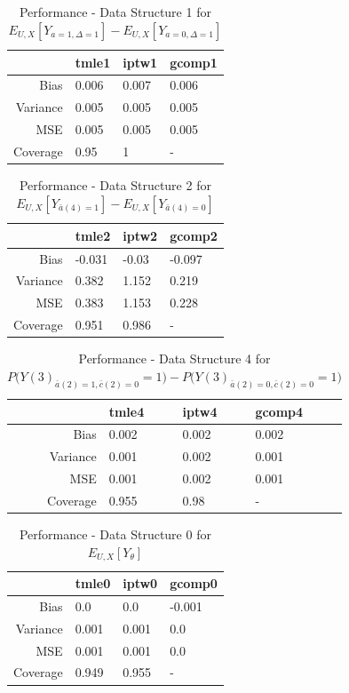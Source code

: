 \documentclass[answers]{exam}
\begin{document}
\begin{table}[!h]
\centering
\begin{tabular}{rlll}
  \hline
 & tmle1 & iptw1 & gcomp1 \\ 
  \hline
Bias & 0.006 & 0.007 & 0.006 \\ 
  Variance & 0.005 & 0.005 & 0.005 \\ 
  MSE & 0.005 & 0.005 & 0.005 \\ 
  Coverage & 0.95 & 1 & - \\ 
   \hline
\end{tabular}
\caption{Performance - Data Structure 1 for $E_{U,X}[Y_{a=1, \Delta=1}] - E_{U,X}[Y_{a=0, \Delta=1}]$} 
\end{table}
\begin{table}[!h]
\centering
\begin{tabular}{rlll}
  \hline
 & tmle2 & iptw2 & gcomp2 \\ 
  \hline
Bias & -0.031 & -0.03 & -0.097 \\ 
  Variance & 0.382 & 1.152 & 0.219 \\ 
  MSE & 0.383 & 1.153 & 0.228 \\ 
  Coverage & 0.951 & 0.986 & - \\ 
   \hline
\end{tabular}
\caption{Performance - Data Structure 2 for $E_{U,X}[Y_{\bar{a}(4)=1}] - E_{U,X}[Y_{\bar{a}(4)=0}]$} 
\end{table}
\begin{table}[!h]
\centering
\begin{tabular}{rlll}
  \hline
 & tmle4 & iptw4 & gcomp4 \\ 
  \hline
Bias & 0.002 & 0.002 & 0.002 \\ 
  Variance & 0.001 & 0.002 & 0.001 \\ 
  MSE & 0.001 & 0.002 & 0.001 \\ 
  Coverage & 0.955 & 0.98 & - \\ 
   \hline
\end{tabular}
\caption{Performance - Data Structure 4 for $P\big(Y(3)_{\bar{a}(2) = 1, \bar{c}(2) = 0} = 1\big) - P\big(Y(3)_{\bar{a}(2) = 0, \bar{c}(2) = 0} = 1\big)$} 
\end{table}
\begin{table}[!h]
\centering
\begin{tabular}{rlll}
  \hline
 & tmle0 & iptw0 & gcomp0 \\ 
  \hline
Bias & 0.0 & 0.0 & -0.001 \\ 
  Variance & 0.001 & 0.001 & 0.0 \\ 
  MSE & 0.001 & 0.001 & 0.0 \\ 
  Coverage & 0.949 & 0.955 & - \\ 
   \hline
\end{tabular}
\caption{Performance - Data Structure 0 for $E_{U,X}[Y_{\theta}]$} 
\end{table}
\end{document}
